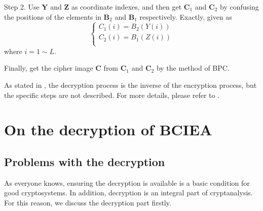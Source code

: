 \documentclass[final,3p,times]{elsarticle}
\begin{document}
\begin{itemize}
	Step 2. Use $\bm{Y}$ and $\bm{Z}$ as coordinate indexes, and then get $\bm{C}_1$ and $\bm{C}_2$ by confusing the positions of the elements in $\bm{B}_2$ and $\bm{B}_1$ respectively. Exactly, given as
	\begin{equation}
	\left\{ \begin{array}{l}
	C_1(i) = B_2(Y(i))\\
	C_2(i) = B_1(Z(i))\\
	\end{array} \right.
	\label{eq:confusion}
	\end{equation}
	where $i=1 \sim L$. 
	
	Finally, get the cipher image $\bm{C}$ from $\bm{C}_1$ and $\bm{C}_2$ by the method of BPC.
\end{itemize}
As stated in \cite{LuX2016OLE}, the decryption process is the inverse of the encryption process, but the specific steps are not described. For more details, please refer to \cite{LuX2016OLE}. 

\section{On the decryption of BCIEA}
\label{sec3:decryption}

\subsection{Problems with the decryption}

As everyone knows, ensuring the decryption is available is a basic condition for good cryptosystems. In addition, decryption is an integral part of cryptanalysis. For this reason, we discuss the decryption part firstly.
\end{document}
